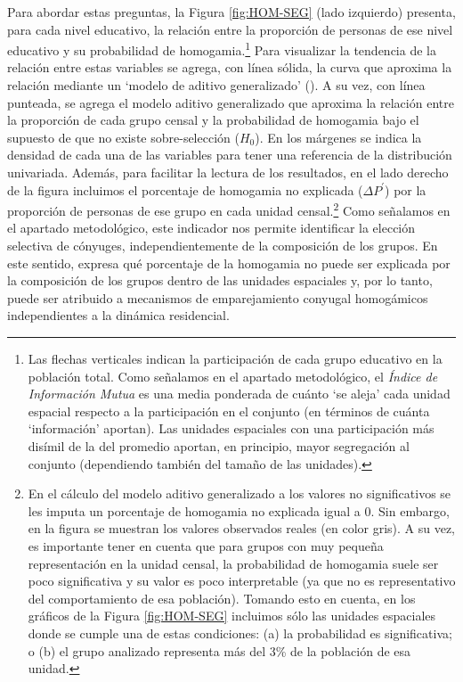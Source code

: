 \documentclass[
  spanish,
  a4paper,%
  chapterprefix=true,%
  DIV=calc,%
  twoside]{scrbook}%
\begin{document}
Para abordar estas preguntas, la Figura \ref{fig:HOM-SEG} (lado
izquierdo) presenta, para cada nivel educativo, la relación entre la
proporción de personas de ese nivel educativo y su probabilidad de
homogamia.\footnote{Las flechas verticales indican la
  participación de cada grupo educativo en la población total. Como
  señalamos en el apartado metodológico, el \emph{Índice de Información
  Mutua} es una media ponderada de cuánto `se aleja' cada unidad
  espacial respecto a la participación en el conjunto (en términos de
  cuánta `información' aportan). Las unidades espaciales con una
  participación más disímil de la del promedio aportan, en principio,
  mayor segregación al conjunto (dependiendo también del tamaño de las
  unidades).} Para visualizar la tendencia de
la relación entre estas variables se agrega, con línea sólida, la curva
que aproxima la relación mediante un `modelo de aditivo generalizado'
(). A su vez, con línea punteada, se agrega el modelo aditivo
generalizado que aproxima la relación entre la proporción de cada grupo
censal y la probabilidad de homogamia bajo el supuesto de que no existe
sobre-selección (\(H_0\)). En los márgenes se indica la densidad de cada
una de las variables para tener una referencia de la distribución
univariada. Además, para facilitar la lectura de los resultados, en el
lado derecho de la figura incluimos el porcentaje de homogamia no
explicada (\(\Delta P^\prime\)) por la proporción de personas de ese grupo
en cada unidad censal.\footnote{En el cálculo del modelo aditivo
  generalizado a los valores no significativos se les imputa un
  porcentaje de homogamia no explicada igual a 0. Sin embargo, en la
  figura se muestran los valores observados reales (en color gris). A
  su vez, es importante tener en cuenta que para grupos con muy
  pequeña representación en la unidad censal, la probabilidad de
  homogamia suele ser poco significativa y su valor es poco
  interpretable (ya que no es representativo del comportamiento de esa
  población). Tomando esto en cuenta, en los gráficos de la Figura
  \ref{fig:HOM-SEG} incluimos sólo las unidades espaciales donde se
  cumple una de estas condiciones: (a) la probabilidad es
  significativa; o (b) el grupo analizado representa más del 3\% de la
  población de esa unidad.} Como señalamos en el
apartado metodológico, este indicador nos permite identificar la
elección selectiva de cónyuges, independientemente de la composición de
los grupos. En este sentido, expresa qué porcentaje de la homogamia no
puede ser explicada por la composición de los grupos dentro de las
unidades espaciales y, por lo tanto, puede ser atribuido a mecanismos de
emparejamiento conyugal homogámicos independientes a la dinámica
residencial.
\end{document}
